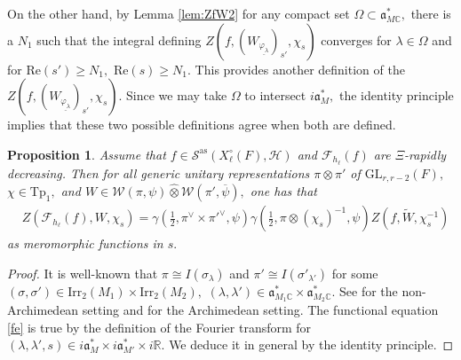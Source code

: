 \documentclass[12pt]{amsart}
\newtheorem{prop}[thm]{Proposition}
\theoremstyle{remark}
\numberwithin{equation}{section}
\newcommand{\GL}{\mathrm{GL}}
\newcommand{\CC}{\mathbb{C}}
\newcommand{\RR}{\mathbb{R}}
\theoremstyle{definition}
\numberwithin{equation}{subsection}
\begin{document}
On the other hand, by Lemma \ref{lem:ZfW2} for any compact set $\Omega \subset \mathfrak{a}_{M\CC}^*,$ there is a $N_1$ such that the integral defining 
 $Z(f,(W_{\underline{\varphi_{\lambda}}})_{s'},\chi_s)$ converges for $\lambda \in \Omega$ and for  $\mathrm{Re}(s') \geq N_1,$ $\mathrm{Re}(s) \geq N_1.$  This provides another definition of the $Z(f,(W_{\underline{\varphi_{\lambda}}})_{s'},\chi_s).$  Since we may take $\Omega$ to intersect $i\mathfrak{a}_M^*,$ the identity principle implies that these two possible definitions agree when both are defined.


\begin{prop}\label{zetafuncequa}
Assume that $f \in \mathcal{S}^{\mathrm{as}}(X_\ell^{\circ}(F),\mathcal{H})$ and $\mathcal{F}_{h_\ell}(f)$ are $\Xi$-rapidly decreasing.  Then for all generic unitary representations $\pi \otimes \pi'$ of $\GL_{r,r-2}(F),$ $\chi \in \mathrm{Tp}_1,$ and $W \in \mathcal{W}(\pi,\psi) \widehat{\otimes} \mathcal{W}(\pi',\overline{\psi}),$ one has that
\begin{align} \label{fe}
    &Z(\mathcal{F}_{h_\ell}(f),W,\chi_s)=
    \gamma(\tfrac{1}{2},\pi^\vee \times \pi'^\vee,\psi)\gamma(\tfrac{1}{2},
    \pi \otimes (\chi_s)^{-1},\psi)Z(f,\widetilde{W},\chi^{-1}_s)
\end{align}
as meromorphic functions in $s.$ 
\end{prop}

\begin{proof}
It is well-known that $\pi \cong I(\sigma_\lambda)$  and $\pi' \cong I(\sigma'_{\lambda'})$ for some $(\sigma,\sigma') \in \mathrm{Irr}_2(M_1) \times \mathrm{Irr}_2(M_2),$  $(\lambda,\lambda') \in \mathfrak{a}_{M_1\CC}^* \times \mathfrak{a}_{M_2\CC}^*.$ See \cite[Theorem 8.4.4]{Getz:Hahn} for the non-Archimedean setting and \cite[Lemma 2.5]{JacquetPerfectRS} for the Archimedean setting.  
The functional equation \eqref{fe}
is true by the definition of the Fourier transform for $(\lambda,\lambda',s) \in i\mathfrak{a}_M^* \times i\mathfrak{a}_{M'}^* \times i\RR.$ 
We deduce it in general by the identity principle.
\end{proof}
\end{document}
